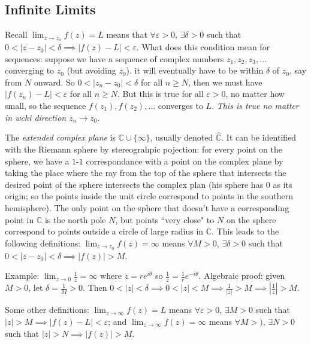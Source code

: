 \documentclass{article}
\theoremstyle{plain}
\theoremstyle{remark}
\newcommand{\C}{{\mathbb C}}
\newcommand{\ep}{{\varepsilon}}
\begin{document}
\subsection{Infinite Limits}
Recall $\lim_{z\to z_0}f(z) = L$ means that
$\forall \ep > 0$, $\exists \delta > 0$ such that
$0 < \lvert z-z_0\rvert < \delta \implies \lvert f(z) - L \rvert < \ep$.
What does this condition mean for sequences:
 suppose we have a sequence of complex numbers $z_1,z_2,z_3,\dots$
 converging to $z_0$ (but avoiding $z_0$).
 it will eventually have to be within $\delta$ of $z_0$, say from $N$ onward.
 So $0 < \lvert z_n - z_0 \rvert < \delta$ for all $n \geq N$,
 then we must have $\lvert f(z_n) - L \rvert < \ep$ for all $n \geq N$.
 But this is true for all $\ep > 0$, no matter how small,
 so the sequence $f(z_1),f(z_2),\dots$ converges to $L$.
 \emph{This is true no matter in wchi direction $z_n \to z_0$.}

 The \emph{extended complex plane} is $\C \cup \{\infty\}$,
 usually denoted $\hat{\C}$.
 It can be identified with the Riemann sphere by stereograhpic pojection:
 for every point on the sphere, we have a $1$-$1$ correspondance
 with a point on the complex plane by taking the place where
 the ray from the top of the sphere that intersects the desired point of the sphere
 intersects the complex plan
 (his sphere has $0$ as its origin; so the points inside the unit circle
 correspond to points in the southern hemisphere).
 The only point on the sphere that doesn't have a corresponding point in $\C$
 is the north pole $N$, but points ``very close" to $N$ on the sphere
 correspond to points outside a circle of large radius in $\C$.
 This leads to the following definitions:
 $\lim_{z \to z_0}f(z) = \infty$ means $\forall M > 0$, $\exists \delta > 0$
 such that $0 < \lvert z - z_0 \rvert < \delta \implies \lvert f(z) \rvert > M$.

 Example: $\lim_{z \to 0}\frac{1}{z} = \infty$ where
 $z = re^{i\theta}$ so $\frac{1}{z} = \frac{1}{r}e^{-i\theta}$.
 Algebraic proof: given $M > 0$, let $\delta = \frac{1}{M} > 0$.
 Then $0 < \lvert z \rvert < \delta \implies 0 < \lvert z \rvert < M
 \implies \frac{1}{|z|} > M \implies \left\lvert \frac{1}{z} \right\rvert > M$.

 Some other definitions:
 $\lim_{z \to \infty} f(z) = L$ means $\forall \ep > 0$, $\exists M > 0$
 such that $\lvert z \rvert > M \implies \lvert f(z) - L \rvert < \ep$;
 and $\lim_{z \to \infty} f(z) = \infty$ means $\forall M > )$, $\exists N > 0$
 such that $\lvert z \rvert > N \implies \lvert f(z) \rvert > M$.
\end{document}
